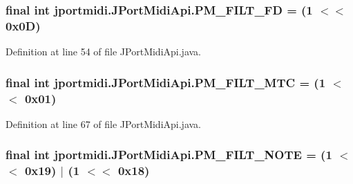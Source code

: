 \subsubsection[{\texorpdfstring{P\+M\+\_\+\+F\+I\+L\+T\+\_\+\+FD}{PM_FILT_FD}}]{\setlength{\rightskip}{0pt plus 5cm}final {\bf int} jportmidi.\+J\+Port\+Midi\+Api.\+P\+M\+\_\+\+F\+I\+L\+T\+\_\+\+FD = (1 $<$$<$ 0x0\+D)\hspace{0.3cm}{\ttfamily [static]}}\hypertarget{classjportmidi_1_1_j_port_midi_api_a5647429b30ab0cbe965d639f3a24529e}{}\label{classjportmidi_1_1_j_port_midi_api_a5647429b30ab0cbe965d639f3a24529e}


Definition at line 54 of file J\+Port\+Midi\+Api.\+java.

\subsubsection[{\texorpdfstring{P\+M\+\_\+\+F\+I\+L\+T\+\_\+\+M\+TC}{PM_FILT_MTC}}]{\setlength{\rightskip}{0pt plus 5cm}final {\bf int} jportmidi.\+J\+Port\+Midi\+Api.\+P\+M\+\_\+\+F\+I\+L\+T\+\_\+\+M\+TC = (1 $<$$<$ 0x01)\hspace{0.3cm}{\ttfamily [static]}}\hypertarget{classjportmidi_1_1_j_port_midi_api_a33f04e9c4975dbf77745300850fed838}{}\label{classjportmidi_1_1_j_port_midi_api_a33f04e9c4975dbf77745300850fed838}


Definition at line 67 of file J\+Port\+Midi\+Api.\+java.

\subsubsection[{\texorpdfstring{P\+M\+\_\+\+F\+I\+L\+T\+\_\+\+N\+O\+TE}{PM_FILT_NOTE}}]{\setlength{\rightskip}{0pt plus 5cm}final {\bf int} jportmidi.\+J\+Port\+Midi\+Api.\+P\+M\+\_\+\+F\+I\+L\+T\+\_\+\+N\+O\+TE = (1 $<$$<$ 0x19) $\vert$ (1 $<$$<$ 0x18)\hspace{0.3cm}{\ttfamily [static]}}\hypertarget{classjportmidi_1_1_j_port_midi_api_a5c49dbdc802059a30a90794e65560fb5}{}\label{classjportmidi_1_1_j_port_midi_api_a5c49dbdc802059a30a90794e65560fb5}


